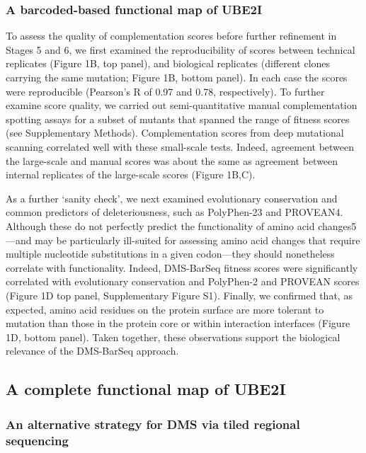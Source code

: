 \subsubsection{A barcoded-based functional map of UBE2I}

To assess the quality of complementation scores before further refinement in Stages 5 and 6, we first examined the reproducibility of scores between technical replicates (Figure 1B, top panel), and biological replicates (different clones carrying the same mutation; Figure 1B, bottom panel).  In each case the scores were reproducible (Pearson’s R of 0.97 and 0.78, respectively).   To further examine score quality, we carried out semi-quantitative manual complementation spotting assays for a subset of mutants that spanned the range of fitness scores (see Supplementary Methods). Complementation scores from deep mutational scanning correlated well with these small-scale tests. Indeed, agreement between the large-scale and manual scores was about the same as agreement between internal replicates of the large-scale scores (Figure 1B,C). 

As a further ‘sanity check’, we next examined evolutionary conservation and common predictors of deleteriousness, such as PolyPhen-23 and PROVEAN4.  Although these do not perfectly predict the functionality of amino acid changes5 —and may be particularly ill-suited for assessing amino acid changes that require multiple nucleotide substitutions in a given codon—they should nonetheless correlate with functionality.  Indeed, DMS-BarSeq fitness scores were significantly correlated with evolutionary conservation and PolyPhen-2 and PROVEAN scores (Figure 1D top panel, Supplementary Figure S1). Finally, we confirmed that, as expected, amino acid residues on the protein surface are more tolerant to mutation than those in the protein core or within interaction interfaces (Figure 1D, bottom panel).  Taken together, these observations support the biological relevance of the DMS-BarSeq approach.

\subsection{A complete functional map of UBE2I}

\subsubsection{An alternative strategy for DMS via tiled regional sequencing}

